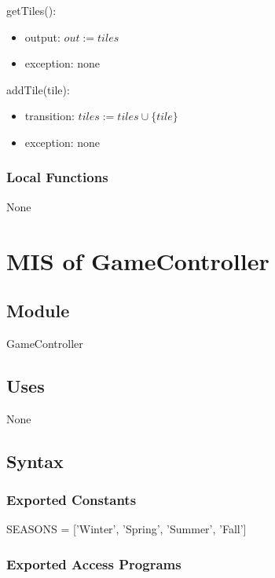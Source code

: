 \documentclass[12pt, titlepage]{article}
\begin{document}
\noindent getTiles():
\begin{itemize}
\item output: $out := tiles$
\item exception: none
\end{itemize}

\noindent addTile(tile):
\begin{itemize}
\item transition: $tiles := tiles \cup \{tile\}$
\item exception: none
\end{itemize}

\subsubsection{Local Functions}

None
  
\medskip
\newpage

\section{MIS of GameController} \label{ServerAuth} 

\subsection{Module}

GameController

\subsection{Uses}

None

\subsection{Syntax}

\subsubsection{Exported Constants}

SEASONS = ['Winter', 'Spring', 'Summer', 'Fall']

\subsubsection{Exported Access Programs}
\end{document}
